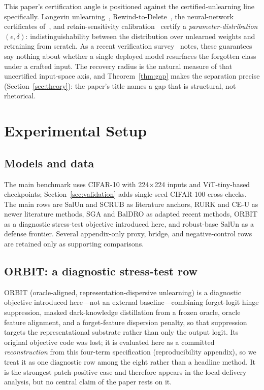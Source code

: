 \documentclass{article}
\begin{document}
This paper's certification angle is positioned against the certified-unlearning line specifically. Langevin unlearning~\cite{chien2024langevin}, Rewind-to-Delete~\cite{mu2025rewind}, the neural-network certificates of~\cite{koloskova2025certified}, and retain-sensitivity calibration~\cite{heinzler2026retain} certify a \emph{parameter-distribution} $(\epsilon,\delta)$: indistinguishability between the distribution over unlearned weights and retraining from scratch. As a recent verification survey~\cite{xue2026survey} notes, these guarantees say nothing about whether a single deployed model resurfaces the forgotten class under a crafted input. The recovery radius is the natural measure of that uncertified input-space axis, and Theorem~\ref{thm:gap} makes the separation precise (Section~\ref{sec:theory}): the paper's title names a gap that is structural, not rhetorical.

\section{Experimental Setup}
\subsection{Models and data}
The main benchmark uses CIFAR-10 with 224$\times$224 inputs and ViT-tiny-based checkpoints; Section~\ref{sec:validation} adds single-seed CIFAR-100 cross-checks. The main rows are SalUn and SCRUB as literature anchors, RURK and CE-U as newer literature methods, SGA and BalDRO as adapted recent methods, ORBIT as a diagnostic stress-test objective introduced here, and robust-base SalUn as a defense frontier. Several appendix-only proxy, bridge, and negative-control rows are retained only as supporting comparisons.



\subsection{ORBIT: a diagnostic stress-test row}
ORBIT (oracle-aligned, representation-dispersive unlearning) is a diagnostic objective introduced here---not an external baseline---combining forget-logit hinge suppression, masked dark-knowledge distillation from a frozen oracle, oracle feature alignment, and a forget-feature dispersion penalty, so that suppression targets the representational substrate rather than only the output logit. Its original objective code was lost; it is evaluated here as a committed \emph{reconstruction} from this four-term specification (reproducibility appendix), so we treat it as one diagnostic row among the eight rather than a headline method. It is the strongest patch-positive case and therefore appears in the local-delivery analysis, but no central claim of the paper rests on it.
\end{document}
